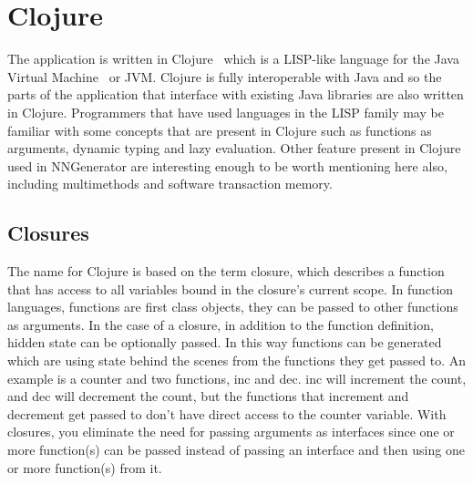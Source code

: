 \chapter[Clojure]{Clojure}
The application is written in Clojure~\cite{clj} which is a LISP-like language for the Java Virtual Machine~\cite{jvm} or JVM. Clojure is fully interoperable with Java and so the parts of the application that interface with existing Java libraries are also written in Clojure.
Programmers that have used languages in the LISP family may be familiar with some concepts that are present in Clojure such as functions as arguments, dynamic typing and lazy evaluation. Other feature present in Clojure used in NNGenerator are interesting enough to be worth mentioning here also, including multimethods and software transaction memory.

\section{Closures}
The name for Clojure is based on the term closure, which describes a function that has access to all variables bound in the closure's current scope. In function languages, functions are first class objects, they can be passed to other functions as arguments. In the case of a closure, in addition to the function definition, hidden state can be optionally passed. In this way functions can be generated which are using state behind the scenes from the functions they get passed to. An example is a counter and two functions, inc and dec. inc will increment the count, and dec will decrement the count, but the functions that increment and decrement get passed to don't have direct access to the counter variable. With closures, you eliminate the need for passing arguments as interfaces since one or more function(s) can be passed instead of passing an interface and then using one or more function(s) from it. 

